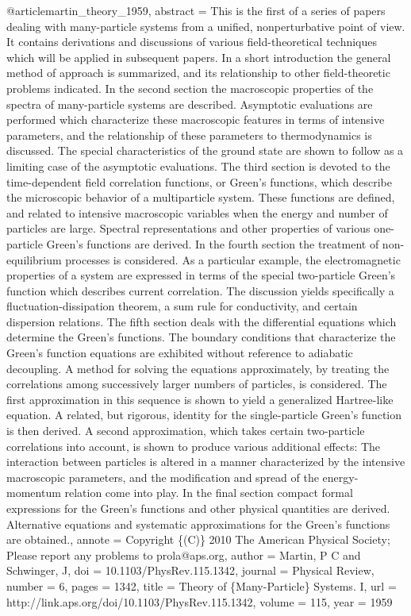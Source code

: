 @article{martin_theory_1959,
abstract = {This is the first of a series of papers dealing with many-particle systems from a unified, nonperturbative point of view. It contains derivations and discussions of various field-theoretical techniques which will be applied in subsequent papers. In a short introduction the general method of approach is summarized, and its relationship to other field-theoretic problems indicated. In the second section the macroscopic properties of the spectra of many-particle systems are described. Asymptotic evaluations are performed which characterize these macroscopic features in terms of intensive parameters, and the relationship of these parameters to thermodynamics is discussed. The special characteristics of the ground state are shown to follow as a limiting case of the asymptotic evaluations. The third section is devoted to the time-dependent field correlation functions, or Green's functions, which describe the microscopic behavior of a multiparticle system. These functions are defined, and related to intensive macroscopic variables when the energy and number of particles are large. Spectral representations and other properties of various one-particle Green's functions are derived. In the fourth section the treatment of non-equilibrium processes is considered. As a particular example, the electromagnetic properties of a system are expressed in terms of the special two-particle Green's function which describes current correlation. The discussion yields specifically a fluctuation-dissipation theorem, a sum rule for conductivity, and certain dispersion relations. The fifth section deals with the differential equations which determine the Green's functions. The boundary conditions that characterize the Green's function equations are exhibited without reference to adiabatic decoupling. A method for solving the equations approximately, by treating the correlations among successively larger numbers of particles, is considered. The first approximation in this sequence is shown to yield a generalized Hartree-like equation. A related, but rigorous, identity for the single-particle Green's function is then derived. A second approximation, which takes certain two-particle correlations into account, is shown to produce various additional effects: The interaction between particles is altered in a manner characterized by the intensive macroscopic parameters, and the modification and spread of the energy-momentum relation come into play. In the final section compact formal expressions for the Green's functions and other physical quantities are derived. Alternative equations and systematic approximations for the Green's functions are obtained.},
annote = {Copyright \{(C)\} 2010 The American Physical Society; Please report any problems to prola@aps.org},
author = {Martin, P C and Schwinger, J},
doi = {10.1103/PhysRev.115.1342},
journal = {Physical Review},
number = {6},
pages = {1342},
title = {{Theory of \{Many-Particle\} Systems. I}},
url = {http://link.aps.org/doi/10.1103/PhysRev.115.1342},
volume = {115},
year = {1959}
}
